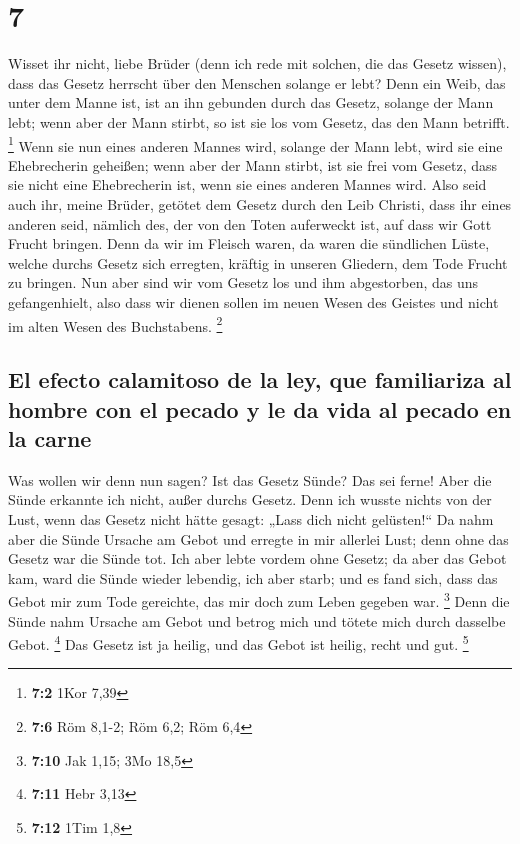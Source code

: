 \hypertarget{section-6}{%
\section{7}\label{section-6}}

 Wisset ihr nicht, liebe Brüder (denn ich rede mit
solchen, die das Gesetz wissen), dass das Gesetz herrscht über den
Menschen solange er lebt?  Denn ein Weib, das unter dem
Manne ist, ist an ihn gebunden durch das Gesetz, solange der Mann lebt;
wenn aber der Mann stirbt, so ist sie los vom Gesetz, das den Mann
betrifft. \footnote{\textbf{7:2} 1Kor 7,39}  Wenn sie nun
eines anderen Mannes wird, solange der Mann lebt, wird sie eine
Ehebrecherin geheißen; wenn aber der Mann stirbt, ist sie frei vom
Gesetz, dass sie nicht eine Ehebrecherin ist, wenn sie eines anderen
Mannes wird.  Also seid auch ihr, meine Brüder, getötet
dem Gesetz durch den Leib Christi, dass ihr eines anderen seid, nämlich
des, der von den Toten auferweckt ist, auf dass wir Gott Frucht bringen.
 Denn da wir im Fleisch waren, da waren die sündlichen
Lüste, welche durchs Gesetz sich erregten, kräftig in unseren Gliedern,
dem Tode Frucht zu bringen.  Nun aber sind wir vom Gesetz
los und ihm abgestorben, das uns gefangenhielt, also dass wir dienen
sollen im neuen Wesen des Geistes und nicht im alten Wesen des
Buchstabens. \footnote{\textbf{7:6} Röm 8,1-2; Röm 6,2; Röm 6,4}

\hypertarget{el-efecto-calamitoso-de-la-ley-que-familiariza-al-hombre-con-el-pecado-y-le-da-vida-al-pecado-en-la-carne}{%
\subsection{El efecto calamitoso de la ley, que familiariza al hombre
con el pecado y le da vida al pecado en la
carne}\label{el-efecto-calamitoso-de-la-ley-que-familiariza-al-hombre-con-el-pecado-y-le-da-vida-al-pecado-en-la-carne}}

 Was wollen wir denn nun sagen? Ist das Gesetz Sünde? Das
sei ferne! Aber die Sünde erkannte ich nicht, außer durchs Gesetz. Denn
ich wusste nichts von der Lust, wenn das Gesetz nicht hätte gesagt:
„Lass dich nicht gelüsten!{}``  Da nahm aber die Sünde
Ursache am Gebot und erregte in mir allerlei Lust; denn ohne das Gesetz
war die Sünde tot.  Ich aber lebte vordem ohne Gesetz; da
aber das Gebot kam, ward die Sünde wieder lebendig,  ich
aber starb; und es fand sich, dass das Gebot mir zum Tode gereichte, das
mir doch zum Leben gegeben war. \footnote{\textbf{7:10} Jak 1,15; 3Mo
  18,5}  Denn die Sünde nahm Ursache am Gebot und betrog
mich und tötete mich durch dasselbe Gebot. \footnote{\textbf{7:11} Hebr
  3,13}  Das Gesetz ist ja heilig, und das Gebot ist
heilig, recht und gut. \footnote{\textbf{7:12} 1Tim 1,8}


